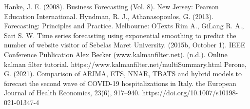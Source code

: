 \documentclass[conference]{IEEEtran}
\begin{document}
\begin{thebibliography}{00}
 Hanke, J. E. (2008). Business Forecasting (Vol. 8). New Jersey:
Pearson Education International.
 Hyndman, R. J., Athanasopoulos, G. (2013). Forecasting:
Principles and Practice. Melbourne: OTexts
 Rim A., GiLang R. A., Sari S. W. Time series forecasting using exponential smoothing to predict the number of website visitor of Sebelas Maret University. (2015b, October 1). IEEE Conference Publication
 Alex Becker (www.kalmanfilter.net). (n.d.). Online kalman filter tutorial. https://www.kalmanfilter.net/multiSummary.html
Perone, G. (2021). Comparison of ARIMA, ETS, NNAR, TBATS and hybrid models to forecast the second wave of COVID-19 hospitalizations in Italy. the European Journal of Health Economics, 23(6), 917–940. https://doi.org/10.1007/s10198-021-01347-4

\end{thebibliography}
\end{document}
